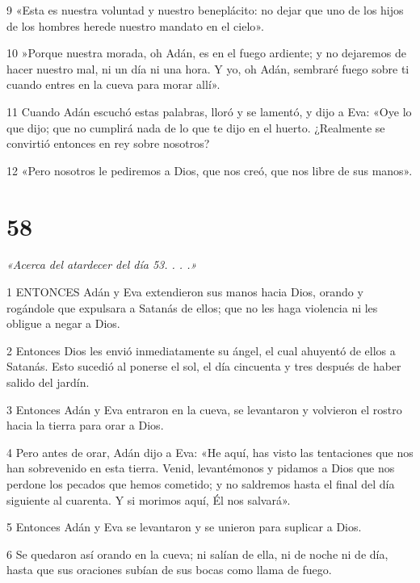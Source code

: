 \par 9 «Esta es nuestra voluntad y nuestro beneplácito: no dejar que uno de los hijos de los hombres herede nuestro mandato en el cielo».

\par 10 »Porque nuestra morada, oh Adán, es en el fuego ardiente; y no dejaremos de hacer nuestro mal, ni un día ni una hora. Y yo, oh Adán, sembraré fuego sobre ti cuando entres en la cueva para morar allí».

\par 11 Cuando Adán escuchó estas palabras, lloró y se lamentó, y dijo a Eva: «Oye lo que dijo; que no cumplirá nada de lo que te dijo en el huerto. ¿Realmente se convirtió entonces en rey sobre nosotros?

\par 12 «Pero nosotros le pediremos a Dios, que nos creó, que nos libre de sus manos».

\chapter{58}

\par \textit{«Acerca del atardecer del día 53. . . .»}

\par 1 ENTONCES Adán y Eva extendieron sus manos hacia Dios, orando y rogándole que expulsara a Satanás de ellos; que no les haga violencia ni les obligue a negar a Dios.

\par 2 Entonces Dios les envió inmediatamente su ángel, el cual ahuyentó de ellos a Satanás. Esto sucedió al ponerse el sol, el día cincuenta y tres después de haber salido del jardín.

\par 3 Entonces Adán y Eva entraron en la cueva, se levantaron y volvieron el rostro hacia la tierra para orar a Dios.

\par 4 Pero antes de orar, Adán dijo a Eva: «He aquí, has visto las tentaciones que nos han sobrevenido en esta tierra. Venid, levantémonos y pidamos a Dios que nos perdone los pecados que hemos cometido; y no saldremos hasta el final del día siguiente al cuarenta. Y si morimos aquí, Él nos salvará».

\par 5 Entonces Adán y Eva se levantaron y se unieron para suplicar a Dios.

\par 6 Se quedaron así orando en la cueva; ni salían de ella, ni de noche ni de día, hasta que sus oraciones subían de sus bocas como llama de fuego.

